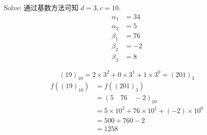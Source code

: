 \documentclass[mode=geye]{elegantnote}
\begin{document}
Solve:
通过基数方法可知 $ d = 3, c = 10 $.
\begin{align*}
	\alpha_{1} &=  34  \\
	\alpha_{2} &=  5   \\
	\beta_{1}  &=  76  \\
	\beta_{2}  &= -2  \\
	\beta_{3}  &=  8  
\end{align*}

\begin{equation*}
	(19)_{10}   = 2 \times 3^2 + 0 \times 3^1 + 1 \times 3^0 = (201)_{3}
\end{equation*}
\begin{align*}
	f((19)_{10}) 
	&= f((201)_3) \\
	&= (5 \quad 76 \quad -2)_{10}\\
	&=5\times 10^2 + 76 \times 10^1 + (-2) \times 10^0\\
	&=500+760-2\\
	&=1258
\end{align*}
\end{document}
